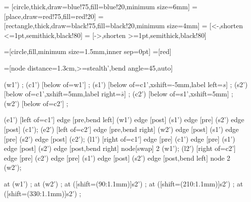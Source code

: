 {
  
=     [circle,thick,draw=blue!75,fill=blue!20,minimum size=6mm]
= [place,draw=red!75,fill=red!20]
=[rectangle,thick,draw=black!75,fill=black!20,minimum size=4mm]
=       [<-,shorten <=1pt,semithick,black!80]
=      [->,shorten >=1pt,semithick,black!80]

=[circle,fill,minimum size=1.5mm,inner sep=0pt]
=[red]

=[node distance=1.3cm,>=stealth',bend angle=45,auto]
\begin{codeexample}[pre=\begin{tikzpicture},post=\end{tikzpicture}]
  \begin{scope}[xshift=6cm]    
    \node [place]     (w1')                                                {};
    \node [place]     (c1') [below of=w1']                                 {};
     (s1') [below of=c1',xshift=-5mm,label left=$s$]      {};
     (s2') [below of=c1',xshift=5mm,label right=$\bar s$] {};
    \node [place]     (c2') [below of=s1',xshift=5mm]                      {};
    \node [place]     (w2') [below of=c2']                                 {};
    
    \node [transition] (e1') [left of=c1'] {}
      edge [pre,bend left]                  (w1')
      edge [post]                           (s1')
      edge [pre]                            (s2')
      edge [post]                           (c1');
    \node [transition] (e2') [left of=c2'] {}
      edge [pre,bend right]                 (w2')
      edge [post]                           (s1')
      edge [pre]                            (s2')
      edge [post]                           (c2');
    \node [transition] (l1') [right of=c1'] {}
      edge [pre]                            (c1')
      edge [pre]                            (s1')
      edge [post]                           (s2')
      edge [post,bend right] node[swap] {2} (w1');
    \node [transition] (l2') [right of=c2'] {}
      edge [pre]                            (c2')
      edge [pre]                            (s1')
      edge [post]                           (s2')
      edge [post,bend left]  node {2}       (w2');

    \node [mark] at (w1') {};
    \node [mark] at (w2') {};
    \node [mark] at ([shift={(90:1.1mm)}]s2') {};
    \node [mark] at ([shift={(210:1.1mm)}]s2') {};
    \node [mark] at ([shift={(330:1.1mm)}]s2') {};
  \end{scope}
\end{codeexample}
}

